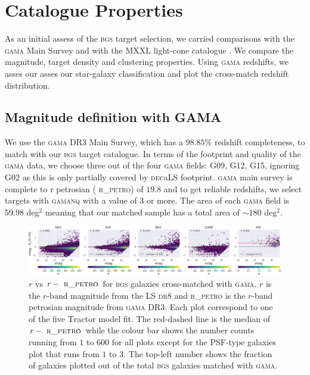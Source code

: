\documentclass[fleqn,usenatbib]{mnras}
\newcommand{\BGS}{\textsc{bgs}\xspace}
\newcommand{\DECaLS}{\textsc{dec}a\textsc{LS}\xspace}
\newcommand{\DReight}{\textsc{dr8}\xspace}
\newcommand{\GAMA}{\textsc{gama}\xspace}
\newcommand{\NQ}{\textsc{nq}\xspace}
\newcommand{\RPETRO}{{\textsc{ r\_petro}}\xspace}
\newcommand{\TRACTOR}{\textsc{T}ractor\xspace}
\begin{document}
\section{Catalogue Properties}
As an initial assess of the \BGS target selection, we carried comparisons with the \GAMA Main Survey \citep{10.1093/mnras/stx3042} and with the MXXL light-cone catalogue \citep{Smith:2017tzz}. We compare the magnitude, target density and clustering properties. Using \GAMA redshifts, we asses our asses our star-galaxy classification and plot the cross-match redshift distribution. 

\subsection{Magnitude definition with GAMA}

We use the \GAMA DR3 Main Survey, which has a $98.85 \%$ redshift completeness, to match with our \BGS target catalogue. In terms of the footprint and quality of the \GAMA data, we choose three out of the four \GAMA fields: G09, G12, G15, ignoring G02 as this is only partially covered by \DECaLS footprint. \GAMA main survey is complete to r petrosian (\RPETRO) of $19.8$ and to get reliable redshifts, we select targets with \GAMA \NQ with a value of $3$ or more. The area of each \GAMA field is $59.98$ deg$^2$ meaning that our matched sample has a total area of $\sim 180$ deg$^2$.

\begin{figure}
	\includegraphics[width=17cm]{images/bgs_gama_mag_diff}
    \caption{ $r$ vs $r-\RPETRO$ for \BGS galaxies cross-matched with \GAMA. $r$ is the $r$-band magnitude from the LS \DReight and \RPETRO is the $r$-band petrosian magnitude from \GAMA DR3. Each plot correspond to one of the five \TRACTOR model fit. The red-dashed line is the median of $r-\RPETRO$ while the colour bar shows the number counts running from $1$ to $600$ for all plots except for the PSF-type galaxies plot that runs from $1$ to $3$. The top-left number shows the fraction of galaxies plotted out of the total \BGS galaxies matched with \GAMA.}
    \label{fig:bgs_gama_magdiff}
\end{figure}
\end{document}

